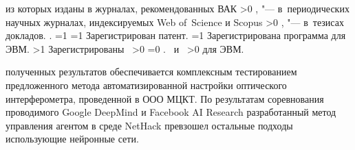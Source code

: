 {\begin{refsection}
             из которых изданы в журналах, рекомендованных ВАК\sloppy%
        \fi%
        \ifnum \value{citeauthorscopuswos}>0%
            ,  "--- в~периодических научных журналах, индексируемых Web of~Science и Scopus\sloppy%
        \fi%
        \ifnum \value{citeauthorconf}>0%
            ,  "--- в~тезисах докладов.
        \else%
            .
        \fi%
        \ifnum \value{citeregistered}=1%
            \ifnum \value{citeauthorpatent}=1%
                Зарегистрирован  патент.
            \fi%
            \ifnum \value{citeauthorprogram}=1%
                Зарегистрирована  программа для ЭВМ.
            \fi%
        \fi%
        \ifnum \value{citeregistered}>1%
            Зарегистрированы\ %
            \ifnum \value{citeauthorpatent}>0%
            \sloppy%
            \ifnum \value{citeauthorprogram}=0 . \else \ и~\fi%
            \fi%
            \ifnum \value{citeauthorprogram}>0%
             для ЭВМ.
            \fi%
        \fi%
    \end{refsection}%
    \begin{refsection}
        \nocite{progbib1}%
        \nocite{confbib1}%
    \end{refsection}%
}
\fi

{\reliability} полученных результатов обеспечивается комплексным тестированием предложенного метода автоматизированной настройки оптического интерферометра, проведенной в ООО МЦКТ. По результатам 
соревнования проводимого Google DeepMind и Facebook AI Research разработанный метод управления агентом в среде NetHack превзошел остальные подходы использующие нейронные сети. 
